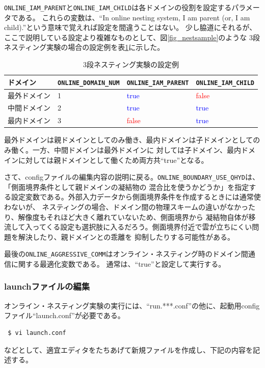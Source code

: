 \verb|ONLINE_IAM_PARENT|と\verb|ONLINE_IAM_CHILD|は各ドメインの役割を設定するパラメータである。
これらの変数は、``In online nesting system, I am parent (or, I am child).''という意味で覚えれば設定を間違うことはない。
少し脇道にそれるが、ここで説明している設定より複雑なものとして、図\ref{fig_nestsample}のような
3段ネスティング実験の場合の設定例を表\ref{tab:triple_nested}に示した。

\begin{table}[htb]
\begin{center}
\caption{3段ネスティング実験の設定例}
\begin{tabularx}{150mm}{|l|l|l|X|} \hline
 \rowcolor[gray]{0.9} ドメイン & \verb|ONLINE_DOMAIN_NUM| & \verb|ONLINE_IAM_PARENT| & \verb|ONLINE_IAM_CHILD|\\ \hline
 最外ドメイン & 1 & \textcolor{blue}{true} & \textcolor{red}{false} \\ \hline
 中間ドメイン & 2 & \textcolor{blue}{true} & \textcolor{blue}{true} \\ \hline
 最内ドメイン & 3 & \textcolor{red}{false} & \textcolor{blue}{true} \\ \hline
\end{tabularx}
\label{tab:triple_nested}
\end{center}
\end{table}

\noindent 最外ドメインは親ドメインとしてのみ働き、最内ドメインは子ドメインとしてのみ働く。一方、中間ドメインは最外ドメインに
対しては子ドメイン、最内ドメインに対しては親ドメインとして働くため両方共``true''となる。

さて、configファイルの編集内容の説明に戻る。\verb|ONLINE_BOUNDARY_USE_QHYD|は、「側面境界条件として親ドメインの凝結物の
混合比を使うかどうか」を指定する設定変数である。外部入力データから側面境界条件を作成するときには通常使わないが、
ネスティングの場合、ドメイン間の物理スキームの違いがなかったり、解像度もそれほど大きく離れていないため、側面境界から
凝結物自体が移流して入ってくる設定も選択肢に入るだろう。側面境界付近で雲が立ちにくい問題を解決したり、親ドメインとの乖離を
抑制したりする可能性がある。

最後の\verb|ONLINE_AGGRESSIVE_COMM|はオンライン・ネスティング時のドメイン間通信に関する最適化変数である。
通常は、``true''と設定して実行する。


\subsubsection{launchファイルの編集}
オンライン・ネスティング実験の実行には、``run.***.conf''の他に、起動用configファイル``launch.conf''が必要である。
\begin{verbatim}
 $ vi launch.conf
\end{verbatim}
などとして、適宜エディタをたちあげて新規ファイルを作成し、下記の内容を記述する。\\

